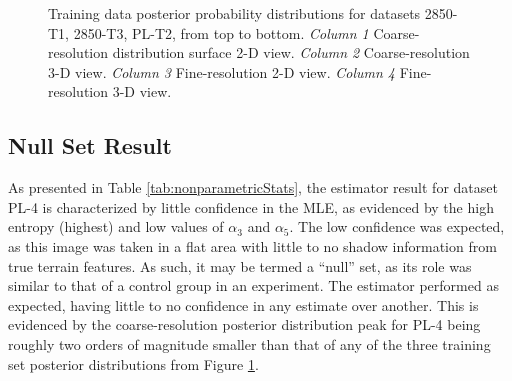 \begin{figure} [h!]
	\caption{Training data posterior probability distributions for datasets 2850-T1, 2850-T3, PL-T2, from top to bottom. \emph{Column 1} Coarse-resolution distribution surface 2-D view. \emph{Column 2} Coarse-resolution 3-D view. \emph{Column 3} Fine-resolution 2-D view. \emph{Column 4} Fine-resolution 3-D view. }
	\label{fig:trainingDistributions}
\end{figure}

\subsection{Null Set Result}
\label{rov.Summary.Null}

As presented in Table \ref{tab:nonparametricStats}, the estimator result for dataset PL-4
is characterized by little confidence in the MLE, as evidenced by the high entropy (highest) and low values of $\alpha_3$ and $\alpha_5$.
The low confidence was expected, as this image was taken in a flat area with little to no shadow information from true terrain features.
As such, it may be termed a ``null'' set, as its role was similar to that of a control group in an experiment.
The estimator performed as expected, having little to no confidence in any estimate over another.
This is evidenced by the coarse-resolution posterior distribution peak for PL-4 being roughly two orders of magnitude smaller than that of any of the three training set posterior distributions from Figure \ref{fig:trainingDistributions}.

